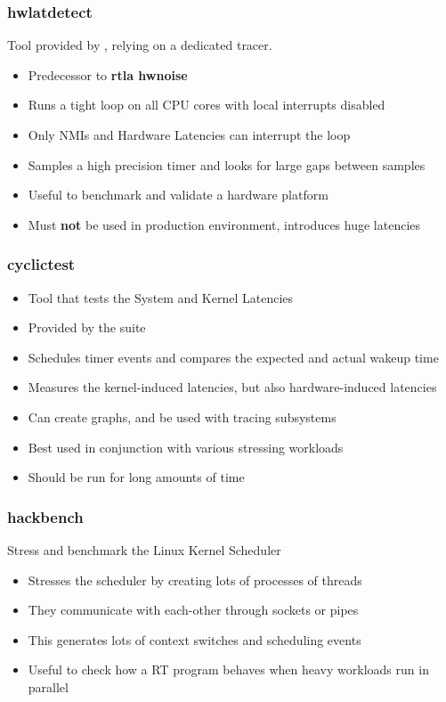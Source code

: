 \begin{frame}
	\frametitle{hwlatdetect}
	Tool provided by , relying on a dedicated  tracer.
	\begin{itemize}
		\item Predecessor to \textbf{rtla hwnoise}
		\item Runs a tight loop on all CPU cores with local interrupts disabled
		\item Only NMIs and Hardware Latencies can interrupt the loop
		\item Samples a high precision timer and looks for large gaps between samples
		\item Useful to benchmark and validate a hardware platform
		\item Must \textbf{not} be used in production environment, introduces huge latencies
	\end{itemize}
\end{frame}



\begin{frame}
	\frametitle{cyclictest}
	\begin{itemize}
		\item Tool that tests the System and Kernel Latencies
		\item Provided by the  suite
		\item Schedules timer events and compares the expected and actual wakeup time
		\item Measures the kernel-induced latencies, but also hardware-induced latencies
		\item Can create graphs, and be used with tracing subsystems
		\item Best used in conjunction with various stressing workloads
		\item Should be run for long amounts of time
	\end{itemize}
\end{frame}

\begin{frame}
	\frametitle{hackbench}
	Stress and benchmark the Linux Kernel Scheduler
	\begin{itemize}
		\item Stresses the scheduler by creating lots of processes of threads
		\item They communicate with each-other through sockets or pipes
		\item This generates lots of context switches and scheduling events
		\item Useful to check how a RT program behaves when heavy workloads run in parallel
	\end{itemize}
\end{frame}

